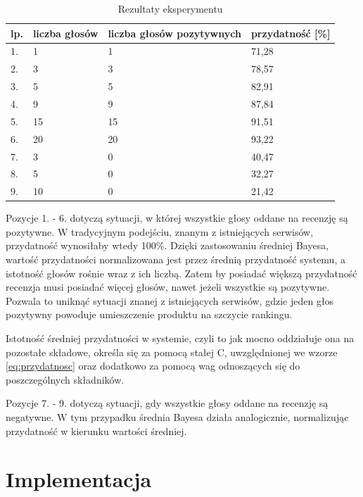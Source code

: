 \begin{table}[H]
\centering
    \begin{tabular}{|l|l|l|l|}
    \hline
    lp. & liczba głosów & liczba głosów pozytywnych & przydatność [\%] \\ \hline\hline
    1. & 1 & 1 & 71,28 \\ \hline
    2. & 3 & 3 & 78,57 \\ \hline
    3. & 5 & 5 & 82,91 \\ \hline
    4. & 9 & 9 & 87,84 \\ \hline
    5. & 15 & 15 & 91,51 \\ \hline
    6. & 20 & 20 & 93,22 \\ \hline
    7. & 3 & 0 & 40,47 \\ \hline
    8. & 5 & 0 & 32,27 \\ \hline
    9. & 10 & 0 & 21,42 \\ \hline
    \end{tabular}
	\caption{Rezultaty eksperymentu}\label{tab:test1}
\end{table}

Pozycje 1. - 6. dotyczą sytuacji, w której wszystkie głosy oddane na recenzję są pozytywne. W tradycyjnym podejściu, znanym z istniejących serwisów, przydatność wynosiłaby wtedy 100\%. Dzięki zastosowaniu średniej Bayesa, wartość przydatności normalizowana jest przez średnią przydatność systemu, a istotność głosów rośnie wraz z ich liczbą. Zatem by posiadać większą przydatność recenzja musi posiadać więcej głosów, nawet jeżeli wszystkie są pozytywne. Pozwala to uniknąć sytuacji znanej z istniejących serwisów, gdzie jeden głos pozytywny powoduje umieszczenie produktu na szczycie rankingu.

Istotność średniej przydatności w systemie, czyli to jak mocno oddziałuje ona na pozostałe składowe, określa się za pomocą stałej C, uwzględnionej we wzorze \ref{eq:przydatnosc} oraz dodatkowo za pomocą wag odnoszących się do poszczególnych składników.

Pozycje 7. - 9. dotyczą sytuacji, gdy wszystkie głosy oddane na recenzję są negatywne. W tym przypadku średnia Bayesa działa analogicznie, normalizując przydatność w kierunku wartości średniej.


\section{Implementacja}

